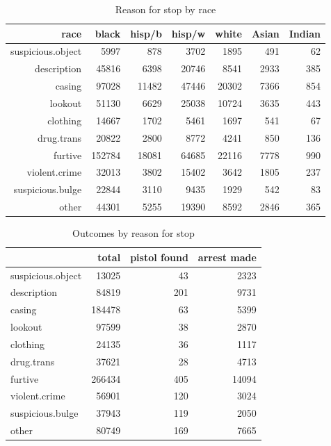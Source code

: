 \documentclass[letterpaper]{article}
\begin{document}
  \begin{table}[H]
    \centering
    \begin{tabular}{rrrrrrr}
      \toprule
      race              & black  & hisp/b & hisp/w & white & Asian & Indian \\
      \midrule
      suspicious.object & 5997   & 878    & 3702   & 1895  & 491   & 62 \\
      description       & 45816  & 6398   & 20746  & 8541  & 2933  & 385 \\
      casing            & 97028  & 11482  & 47446  & 20302 & 7366  & 854 \\
      lookout           & 51130  & 6629   & 25038  & 10724 & 3635  & 443 \\
      clothing          & 14667  & 1702   & 5461   & 1697  & 541   & 67 \\
      drug.trans        & 20822  & 2800   & 8772   & 4241  & 850   & 136 \\
      furtive           & 152784 & 18081  & 64685  & 22116 & 7778  & 990 \\
      violent.crime     & 32013  & 3802   & 15402  & 3642  & 1805  & 237 \\
      suspicious.bulge  & 22844  & 3110   & 9435   & 1929  & 542   & 83 \\
      other             & 44301  & 5255   & 19390  & 8592  & 2846  & 365 \\
      \bottomrule
    \end{tabular}
    \caption{Reason for stop by race}
  \end{table}

  \begin{table}[H]
    \centering
    \begin{tabular}{lrrr}
      \toprule
                          & total  & pistol found & arrest made \\
      \midrule
      suspicious.object   & 13025  & 43           & 2323 \\
      description         & 84819  & 201          & 9731 \\
      casing              & 184478 & 63           & 5399 \\
      lookout             & 97599  & 38           & 2870 \\
      clothing            & 24135  & 36           & 1117 \\
      drug.trans          & 37621  & 28           & 4713 \\
      furtive             & 266434 & 405          & 14094 \\
      violent.crime       & 56901  & 120          & 3024 \\
      suspicious.bulge    & 37943  & 119          & 2050 \\
      other               & 80749  & 169          & 7665 \\
       \bottomrule
    \end{tabular}
    \caption{Outcomes by reason for stop}
  \end{table}
\end{document}

